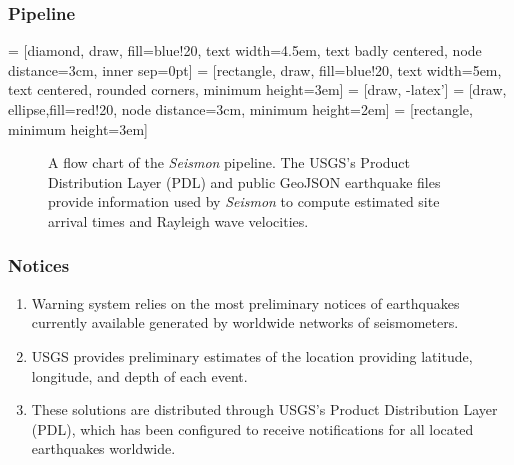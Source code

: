 \documentclass[ignorenonframetext,t,10pt]{beamer}
\begin{document}
\begin{frame}
\frametitle{Pipeline}

 = [diamond, draw, fill=blue!20,
    text width=4.5em, text badly centered, node distance=3cm, inner sep=0pt]
 = [rectangle, draw, fill=blue!20,
    text width=5em, text centered, rounded corners, minimum height=3em]
 = [draw, -latex']
 = [draw, ellipse,fill=red!20, node distance=3cm,
    minimum height=2em]
 = [rectangle, minimum height=3em]

\begin{figure}[t]
 \begin{center}
 \end{center}
 \caption{A flow chart of the \emph{Seismon} pipeline. The USGS's Product Distribution Layer (PDL) and public GeoJSON earthquake files provide information used by \emph{Seismon} to compute estimated site arrival times and Rayleigh wave velocities.}
 \label{fig:flowchart}
\end{figure}
\end{frame}

\begin{frame}
\frametitle{Notices}

  \begin{enumerate}
\item Warning system relies on the most preliminary notices of earthquakes currently available generated by worldwide networks of seismometers. 
\item USGS provides preliminary estimates of the location providing latitude, longitude, and depth of each event.
\item These solutions are distributed through USGS's Product Distribution Layer (PDL), which has been configured to receive notifications for all located earthquakes worldwide. 
  \end{enumerate}
\end{frame}
\end{document}
